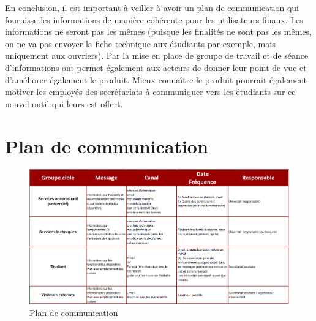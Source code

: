 En conclusion, il est important à veiller à avoir un plan de communication qui fournisse les informations de manière cohérente pour les utilisateurs finaux. Les informations ne seront pas les mêmes (puisque les finalités ne sont pas les mêmes, on ne va pas envoyer la fiche technique aux étudiants par exemple, mais uniquement aux ouvriers). Par la mise en place de groupe de travail et de séance d'informations ont permet également aux acteurs de donner leur point de vue et d'améliorer également le produit. Mieux connaître le produit pourrait également motiver les employés des secrétariats à communiquer vers les étudiants sur ce nouvel outil qui leurs est offert.

\section{Plan de communication}
\begin{figure}[ht]
\includegraphics[width=16cm]{Pictures/tb_plan_com.png}
\caption{Plan de communication}
\label{plan_com}
\end{figure}